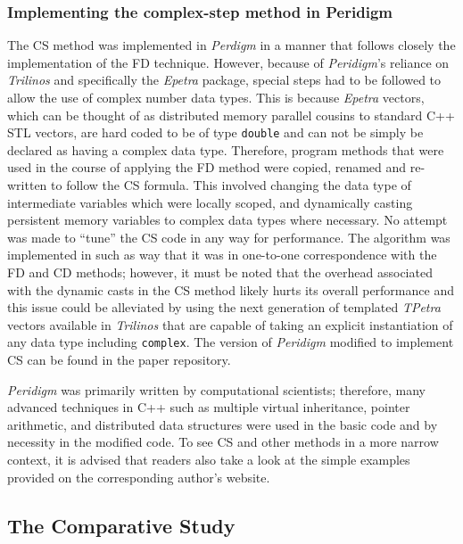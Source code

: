 \documentclass[preprint,12pt]{elsarticle}
\begin{document}
\subsubsection{Implementing the complex-step method in Peridigm} 
%
The CS method was implemented in \emph{Perdigm} in a manner that follows closely the implementation of the FD technique.  However, because of \emph{Peridigm}'s reliance on \emph{Trilinos} and specifically the \emph{Epetra} package, special steps had to be followed to allow the use of complex number data types.  This is because \emph{Epetra} vectors, which can be thought of as distributed memory parallel cousins to standard C++ STL vectors, are hard coded to be of type {\tt double} and can not be simply be declared as having a complex data type. Therefore, program methods that were used in the course of applying the FD method were copied, renamed and re-written to follow the CS formula. This involved changing the data type of intermediate variables which were locally scoped, and dynamically casting persistent memory variables to complex data types where necessary. No attempt was made to ``tune'' the CS code in any way for performance. The algorithm  was implemented in such as way that it was in one-to-one correspondence with the FD and CD methods; however, it must be noted that the overhead associated with the dynamic casts in the CS method likely hurts its overall performance and this issue could be alleviated by using the next generation of templated \emph{TPetra} vectors available in \emph{Trilinos} that are capable of taking an explicit instantiation of any data type including {\tt complex}. The version of \emph{Peridigm} modified to implement CS can be found in the paper repository.  

\emph{Peridigm} was primarily written by computational scientists; therefore, many advanced techniques in C++ such as multiple virtual inheritance, pointer arithmetic, and distributed data structures were used in the basic code and by necessity in the modified code.  To see CS and other methods in a more narrow context, it is advised that readers also take a look at the simple examples provided on the corresponding author's website.

\subsection{The Comparative Study} 
\label{tcs}
\end{document}
